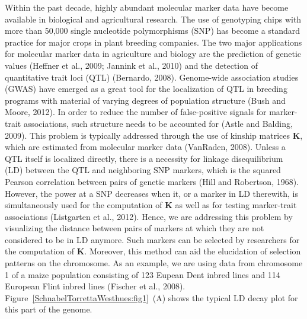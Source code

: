 \documentclass[twoside]{report}
\begin{document}
Within the past decade, highly abundant molecular marker data have become available in biological 
and agricultural research. The use of genotyping chips with more than 50,000 single nucleotide 
polymorphisms (SNP) has become a standard practice for major crops in plant breeding companies. 
The two major applications for molecular marker data in agriculture and biology are the prediction 
of genetic values (Heffner et al., 2009; Jannink et al., 2010) 
and the detection of quantitative trait loci (QTL) 
(Bernardo, 2008). Genome-wide association studies (GWAS) have emerged as a great tool for the 
localization of QTL in breeding programs with material of varying degrees of population structure
(Bush and Moore, 2012). 
In order to reduce the number of false-positive signals for marker-trait associations,
such structure needs to be accounted for (Astle and Balding, 2009). This problem is typically addressed through 
the use of kinship matrices \textbf{K}, which are estimated from molecular marker data 
(VanRaden, 2008).
Unless a QTL itself is localized directly, there is a necessity for linkage disequilibrium (LD) between
the QTL and neighboring SNP markers, which is the squared Pearson correlation between pairs of genetic
markers (Hill and Robertson, 1968). However, the power at a SNP decreases when it, 
or a marker in LD therewith,
is simultaneously used for the computation of \textbf{K} as well as for testing marker-trait 
associations (Listgarten et al., 2012). 
Hence, we are addressing this problem by visualizing the distance
between pairs of markers at which they are not considered to be in LD anymore. Such markers can be 
selected by researchers for the computation of \textbf{K}. Moreover, this method can aid 
the elucidation
of selection patterns on the chromosome. As an example, we are using data from chromosome 1 of a maize 
population consisting of 123 Eupean Dent inbred lines and 114 European Flint inbred lines
(Fischer et al., 2008). Figure~\ref{SchnabelTorrettaWesthues:fig1}~(A) shows the typical LD decay plot 
for this part of the genome. 
\end{document}
